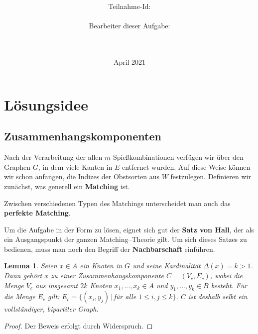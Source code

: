 \documentclass[a4paper,10pt,ngerman]{scrartcl}
\title{\textbf{\Huge\Aufgabe}}
\author{\LARGE Teilnahme-Id: \LARGE \TeilnahmeId \\\\
	    \LARGE Bearbeiter dieser Aufgabe: \\ 
	    \LARGE \Namen\\\\}
\date{\LARGE April 2021}
\newtheorem{lemma}{Lemma}
\newcommand{\TODO}[1]{\todo[inline]{TODO: #1}}
\newcommand{\tbf}[1]{\textbf{#1}}
\begin{document}
\maketitle
\tableofcontents

\section{Lösungsidee}






\subsection{Zusammenhangskomponenten}
Nach der Verarbeitung der allen $m$ Spießkombinationen verfügen wir über den Graphen $G$,
in dem viele Kanten in $E$ entfernet wurden.
Auf diese Weise können wir schon anfangen, die Indizes der Obstsorten aus $W$ festzulegen.
Definieren wir zunächst, was generell ein \tbf{Matching} ist.



\noindent
Zwischen verschiedenen Typen des Matchings unterscheidet man auch das \tbf{perfekte Matching}.



\noindent
Um die Aufgabe in der Form zu lösen, eignet sich gut der \tbf{Satz von Hall},
der als ein Ausgangspunkt der ganzen Matching--Theorie gilt. 
Um sich dieses Satzes zu bedienen, muss man noch den Begriff der \tbf{Nachbarschaft} einführen.








\begin{lemma}\label{lem:grad-groesser1}
Seien $x \in A$ ein Knoten in $G$ und seine Kardinalität $\Delta(x) = k > 1$.
Dann gehört $x$ zu einer Zusammenhangskomponente $C = (V_c, E_c)$, wobei
die Menge $V_c$ aus insgesamt $2k$ Knoten $x_1, ..., x_k \in A$ 
und $y_1, ..., y_k \in B$ besteht. Für die Menge $E_c$ gilt:
$E_c = \{(x_i, y_j) \,|\, $für alle $ 1 \leqslant i,j \leqslant k \}$.
$C$ ist deshalb selbt ein vollständiger, bipartiter Graph.
\end{lemma}
\begin{proof}
Der Beweis erfolgt durch Widerspruch.
\TODO{Beweis} 
\end{proof}
\end{document}
